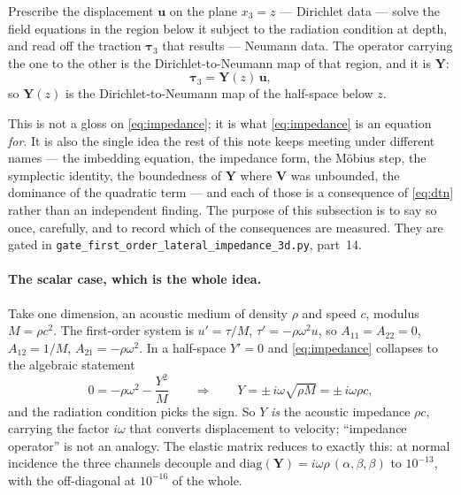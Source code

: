 \documentclass[11pt,a4paper]{article}
\newcommand{\bV}{\mathbf{V}}
\newcommand{\bu}{\mathbf{u}}
\newcommand{\bta}{\boldsymbol{\tau}}
\newcommand{\bY}{\mathbf{Y}}
\begin{document}
Prescribe the displacement $\bu$ on the plane $x_3=z$ --- Dirichlet data ---
solve the field equations in the region below it subject to the radiation
condition at depth, and read off the traction $\bta_3$ that results --- Neumann
data.  The operator carrying the one to the other is the Dirichlet-to-Neumann
map of that region, and it is $\bY$:
\begin{equation}\label{eq:dtn}
  \bta_3 = \bY(z)\,\bu ,
\end{equation}
so $\bY(z)$ is the Dirichlet-to-Neumann map of the half-space below $z$.

This is not a gloss on \eqref{eq:impedance}; it is what \eqref{eq:impedance} is
an equation \emph{for}.  It is also the single idea the rest of this note keeps
meeting under different names --- the imbedding equation, the impedance form,
the M\"obius step, the symplectic identity, the boundedness of $\bY$ where $\bV$
was unbounded, the dominance of the quadratic term --- and each of those is a
consequence of \eqref{eq:dtn} rather than an independent finding.  The purpose
of this subsection is to say so once, carefully, and to record which of the
consequences are measured.  They are gated in
\verb|gate_first_order_lateral_impedance_3d.py|, part~14.

\paragraph{The scalar case, which is the whole idea.}  Take one dimension, an
acoustic medium of density $\rho$ and speed $c$, modulus $M=\rho c^{2}$.  The
first-order system is $u'=\tau/M$, $\tau'=-\rho\omega^{2}u$, so
$A_{11}=A_{22}=0$, $A_{12}=1/M$, $A_{21}=-\rho\omega^{2}$.  In a half-space
$Y'=0$ and \eqref{eq:impedance} collapses to the algebraic statement
\begin{equation}\label{eq:scalarare}
  0 = -\rho\omega^{2} - \frac{Y^{2}}{M}
  \qquad\Longrightarrow\qquad
  Y = \pm\, i\omega\sqrt{\rho M} = \pm\, i\omega\rho c ,
\end{equation}
and the radiation condition picks the sign.  So $Y$ \emph{is} the acoustic
impedance $\rho c$, carrying the factor $i\omega$ that converts displacement to
velocity; ``impedance operator'' is not an analogy.  The elastic matrix reduces
to exactly this: at normal incidence the three channels decouple and
$\mathrm{diag}(\bY)=i\omega\rho\,(\alpha,\beta,\beta)$ to $10^{-13}$, with the
off-diagonal at $10^{-16}$ of the whole.
\end{document}
